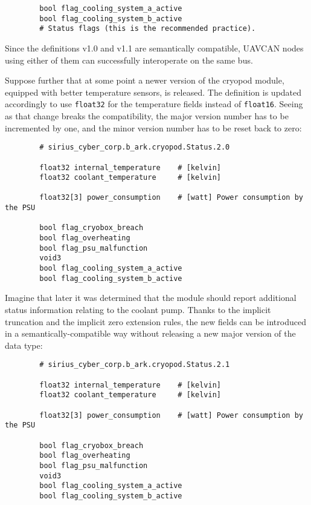 \begin{remark}[breakable]
\begin{verbatim}
        bool flag_cooling_system_a_active
        bool flag_cooling_system_b_active
        # Status flags (this is the recommended practice).
    \end{verbatim}

    Since the definitions v1.0 and v1.1 are semantically compatible,
    UAVCAN nodes using either of them can successfully interoperate on the same bus.

    Suppose further that at some point a newer version of the cryopod module,
    equipped with better temperature sensors, is released.
    The definition is updated accordingly to use \verb|float32| for the temperature fields instead of \verb|float16|.
    Seeing as that change breaks the compatibility, the major version number has to be incremented by one,
    and the minor version number has to be reset back to zero:

    \begin{verbatim}
        # sirius_cyber_corp.b_ark.cryopod.Status.2.0

        float32 internal_temperature    # [kelvin]
        float32 coolant_temperature     # [kelvin]

        float32[3] power_consumption    # [watt] Power consumption by the PSU

        bool flag_cryobox_breach
        bool flag_overheating
        bool flag_psu_malfunction
        void3
        bool flag_cooling_system_a_active
        bool flag_cooling_system_b_active
    \end{verbatim}

    Imagine that later it was determined that the module should report additional status information
    relating to the coolant pump.
    Thanks to the implicit truncation and the implicit zero extension rules,
    the new fields can be introduced in a semantically-compatible way without releasing
    a new major version of the data type:

    \begin{verbatim}
        # sirius_cyber_corp.b_ark.cryopod.Status.2.1

        float32 internal_temperature    # [kelvin]
        float32 coolant_temperature     # [kelvin]

        float32[3] power_consumption    # [watt] Power consumption by the PSU

        bool flag_cryobox_breach
        bool flag_overheating
        bool flag_psu_malfunction
        void3
        bool flag_cooling_system_a_active
        bool flag_cooling_system_b_active


\end{verbatim}
\end{remark}
